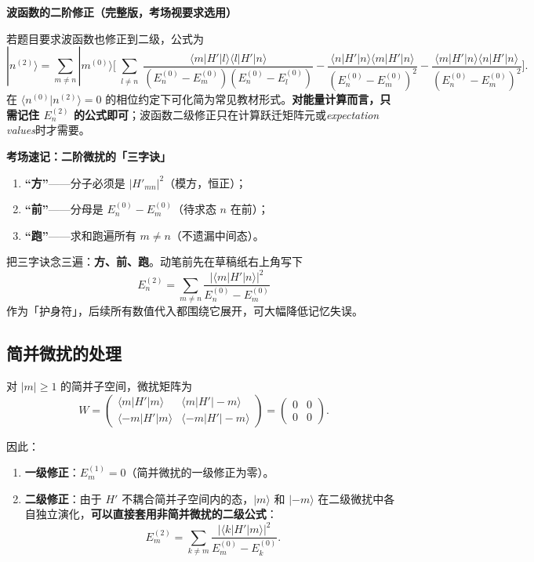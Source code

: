 \begin{derivationbox}[波函数的二阶修正]
\textbf{波函数的二阶修正（完整版，考场视要求选用）}

若题目要求波函数也修正到二级，公式为
\[
|n^{(2)}\rangle = \sum_{m\neq n}|m^{(0)}\rangle\Biggl[
\sum_{\substack{l\neq n}} \frac{\langle m|H'|l\rangle\langle l|H'|n\rangle}{(E_n^{(0)}-E_m^{(0)})(E_n^{(0)}-E_l^{(0)})}
- \frac{\langle n|H'|n\rangle\langle m|H'|n\rangle}{(E_n^{(0)}-E_m^{(0)})^2}
- \frac{\langle m|H'|n\rangle\langle n|H'|n\rangle}{(E_n^{(0)}-E_m^{(0)})^2}
\Biggr].
\]
在 $\langle n^{(0)}|n^{(2)}\rangle=0$ 的相位约定下可化简为常见教材形式。\textbf{对能量计算而言，只需记住 $E_n^{(2)}$ 的公式即可}；波函数二级修正只在计算跃迁矩阵元或\textit{expectation values}时才需要。
\end{derivationbox}

\begin{cheatbox}
\textbf{考场速记：二阶微扰的「三字诀」}
\begin{enumerate}
    \item \textbf{``方''}——分子必须是 $|H'_{mn}|^2$（模方，恒正）；
    \item \textbf{``前''}——分母是 $E_n^{(0)} - E_m^{(0)}$（待求态 $n$ 在前）；
    \item \textbf{``跑''}——求和跑遍所有 $m\neq n$（不遗漏中间态）。
\end{enumerate}
把三字诀念三遍：\textbf{方、前、跑}。动笔前先在草稿纸右上角写下
\[
E_n^{(2)} = \sum_{m\neq n}\frac{|\langle m|H'|n\rangle|^2}{E_n^{(0)}-E_m^{(0)}}
\]
作为「护身符」，后续所有数值代入都围绕它展开，可大幅降低记忆失误。
\end{cheatbox}

\subsection{简并微扰的处理}

\begin{derivationbox}[简并微扰的处理]
对 $|m|\geq 1$ 的简并子空间，微扰矩阵为
\[
W = \begin{pmatrix}
\langle m|H'|m\rangle & \langle m|H'|-m\rangle\\[4pt]
\langle -m|H'|m\rangle & \langle -m|H'|-m\rangle
\end{pmatrix} = \begin{pmatrix} 0 & 0 \\ 0 & 0 \end{pmatrix}.
\]

因此：
\begin{enumerate}
    \item \textbf{一级修正}：$E_m^{(1)} = 0$（简并微扰的一级修正为零）。
    \item \textbf{二级修正}：由于 $H'$ 不耦合简并子空间内的态，$|m\rangle$ 和 $|-m\rangle$ 在二级微扰中各自独立演化，\textbf{可以直接套用非简并微扰的二级公式}：
    \[
    E_m^{(2)} = \sum_{k\neq m}\frac{|\langle k|H'|m\rangle|^2}{E_m^{(0)} - E_k^{(0)}}.
    \]
\end{enumerate}
\end{derivationbox}

